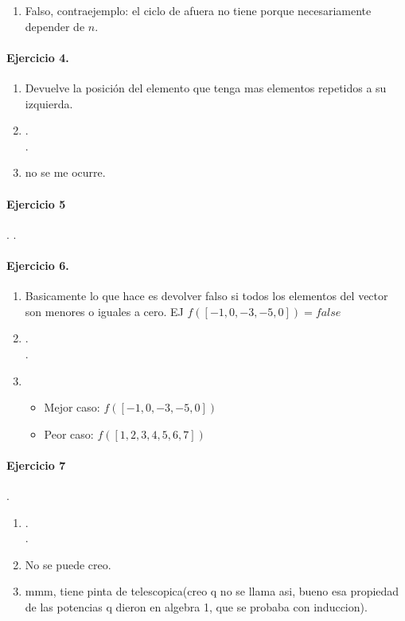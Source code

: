 \documentclass{article}
\begin{document}
\begin{enumerate}[label=\alph*)]
\item Falso, contraejemplo: el ciclo de afuera no tiene porque necesariamente depender de $n$.
\end{enumerate}
\paragraph{Ejercicio 4.}
\begin{enumerate}[label=\alph*)]
\item Devuelve la posición del elemento que tenga mas elementos repetidos a su izquierda.
\item .\\ .
\item no se me ocurre.
\end{enumerate}
\paragraph{Ejercicio 5}.
.
\paragraph{Ejercicio 6.}
\begin{enumerate}[label=\alph*)]
\item Basicamente lo que hace es devolver falso si todos los elementos del vector
	son menores o iguales a cero. EJ $f([-1,0,-3,-5,0])=false$
\item .\\ .
\item \begin{itemize}
			\item Mejor caso: $f([-1,0,-3,-5,0])$
			\item Peor caso: $f([1,2,3,4,5,6,7])$
		\end{itemize}	
\end{enumerate}
\paragraph{Ejercicio 7}.
\begin{enumerate}[label=\alph*)]
\item .\\.
\item No se puede creo.
\item mmm, tiene pinta de telescopica(creo q no se llama asi, bueno esa propiedad de las potencias q dieron en algebra 1, que se probaba con induccion).
\end{enumerate}
\end{document}

